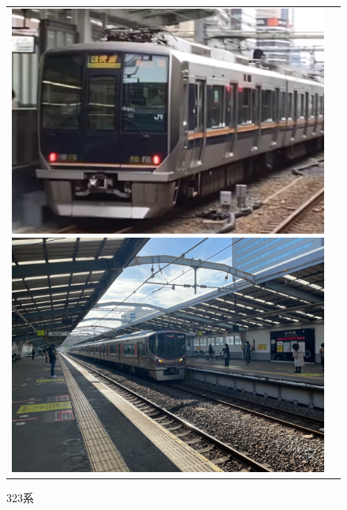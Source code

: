 \begin{figure}[htbp]
	\begin{tabular}{cc}
		\begin{minipage}[b]{0.15\textwidth}
			\includegraphics[width=\linewidth]{densya/321.png}
			\caption{321系}
			\label{fig:321}
		\end{minipage}
		\begin{minipage}[b]{0.15\linewidth}
			\centering
			\includegraphics[width=\linewidth]{densya/323.jpg}
			\caption{323系}
			\label{fig:323}
		\end{minipage}
		\begin{minipage}[b]{0.15\textwidth}

\end{minipage}
\end{tabular}
\end{figure}
